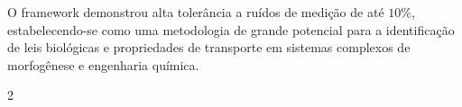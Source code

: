 \documentclass[a4paper, 12pt, twoside]{article}
\begin{document}
O framework demonstrou alta tolerância a ruídos de medição de até $10\%$, estabelecendo-se como uma
metodologia de grande potencial para a identificação de leis biológicas e propriedades de transporte
em sistemas complexos de morfogênese e engenharia química.


\begin{multicols}{2}
\scriptsize
\printbibliography[heading=none]
\end{multicols}
\end{document}
